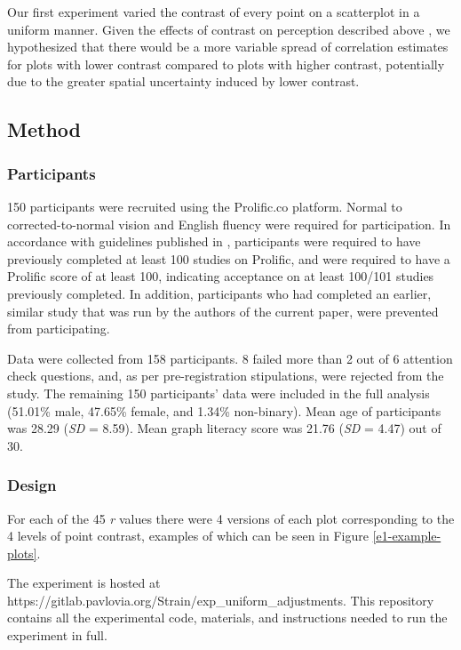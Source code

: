 \documentclass[preprint, 3p,
authoryear]{elsarticle} %
\begin{document}
Our first experiment varied the contrast of every point on a scatterplot
in a uniform manner. Given the effects of contrast on perception
described above \citep{champion_2017, wehrhahn_1990}, we hypothesized
that there would be a more variable spread of correlation estimates for
plots with lower contrast compared to plots with higher contrast,
potentially due to the greater spatial uncertainty induced by lower
contrast.

\hypertarget{method}{%
\subsection{Method}\label{method}}

\hypertarget{participants}{%
\subsubsection{Participants}\label{participants}}

150 participants were recruited using the Prolific.co platform. Normal
to corrected-to-normal vision and English fluency were required for
participation. In accordance with guidelines published in
\citet{peer_2021}, participants were required to have previously
completed at least 100 studies on Prolific, and were required to have a
Prolific score of at least 100, indicating acceptance on at least
100/101 studies previously completed. In addition, participants who had
completed an earlier, similar study that was run by the authors of the
current paper, were prevented from participating.

Data were collected from 158 participants. 8 failed more than 2 out of 6
attention check questions, and, as per pre-registration stipulations,
were rejected from the study. The remaining 150 participants' data were
included in the full analysis (51.01\% male, 47.65\% female, and 1.34\%
non-binary). Mean age of participants was 28.29 (\emph{SD} = 8.59). Mean
graph literacy score was 21.76 (\emph{SD} = 4.47) out of 30.

\hypertarget{design}{%
\subsubsection{Design}\label{design}}

For each of the 45 \emph{r} values there were 4 versions of each plot
corresponding to the 4 levels of point contrast, examples of which can
be seen in Figure \ref{e1-example-plots}.

The experiment is hosted at
https://gitlab.pavlovia.org/Strain/exp\_uniform\_adjustments. This
repository contains all the experimental code, materials, and
instructions needed to run the experiment in full.
\end{document}

